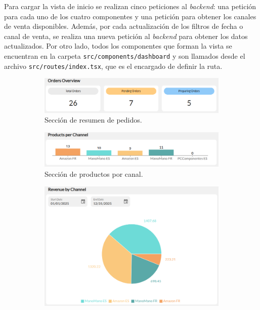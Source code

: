 Para cargar la vista de inicio se realizan cinco peticiones al \textit{backend}: una petición para cada uno de los cuatro componentes y una petición para obtener los canales de venta disponibles. Además, por cada actualización de los filtros de fecha o canal de venta, se realiza una nueva petición al \textit{backend} para obtener los datos actualizados. Por otro lado, todos los componentes que forman la vista se encuentran en la carpeta \texttt{src/components/dashboard} y son llamados desde el archivo \texttt{src/routes/index.tsx}, que es el encargado de definir la ruta.

\begin{figure}[H]
    \centering
    \begin{subfigure}{0.48\linewidth}
        \centering
        \includegraphics[width=\linewidth]{figures/design_develop/screenshots/dash_sec1.png}
        \caption{Sección de resumen de pedidos.}
    \end{subfigure}
    \hfill
    \begin{subfigure}{0.48\linewidth}
        \centering
        \includegraphics[width=\linewidth]{figures/design_develop/screenshots/dash_sec2.png}
        \caption{Sección de productos por canal.}
    \end{subfigure}
    \par\vspace{0.6cm}
    \begin{subfigure}{0.48\linewidth}
        \centering
        \includegraphics[width=\linewidth]{figures/design_develop/screenshots/dash_sec3.png}

\end{subfigure}
\end{figure}
